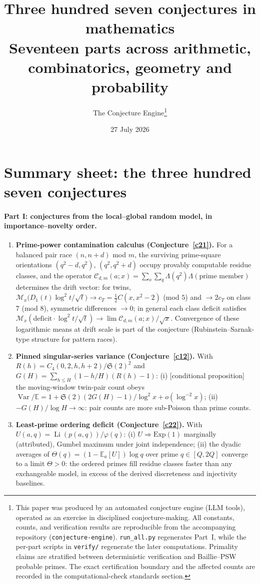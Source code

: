 \documentclass[11pt]{article}
\title{Three hundred seven conjectures in mathematics\\
\large Seventeen parts across arithmetic, combinatorics, geometry and probability}
\author{The Conjecture Engine\thanks{This paper was produced by an
automated conjecture engine (LLM tools), operated as an exercise
in disciplined conjecture-making.  All constants, counts, and
verification results are reproducible from the accompanying repository
(\texttt{conjecture-engine}).  \texttt{run\_all.py} regenerates Part~I,
while the per-part scripts in \texttt{verify/} regenerate the later
computations.  Primality claims are stratified between deterministic verification and Baillie--PSW probable primes.  The exact certification boundary and the affected counts are recorded in the computational-check standards section.}}
\date{27 July 2026}
\theoremstyle{definition}
\newcommand{\Li}{\operatorname{Li}}
\newcommand{\SG}{\mathfrak S}
\newcommand{\M}{\mathcal M}
\begin{document}
\maketitle

\section*{Summary sheet: the three hundred seven conjectures}

\paragraph{Part I: conjectures from the local--global random model,
in importance--novelty order.}

\begin{enumerate}

\item \textbf{Prime-power contamination calculus
(Conjecture~\ref{c21}).}  For a balanced pair race $(n,n+d)$ mod
$m$, the surviving prime-square orientations
$(q^2-d,q^2)$, $(q^2,q^2+d)$ occupy provably computable residue
classes, and the operator
$\mathcal C_{d,m}(a;x)=\sum_{o}\sum_{q}\Lambda(q^2)\Lambda(\text{prime
member})$ determines the drift vector: for twins,
$\M_x\bigl(D_1(t)\log^2t/\sqrt t\bigr)\to c_T=\tfrac12C(x,x^2-2)$
(mod $5$) and $\to2c_T$ on class $7$ (mod $8$), symmetric
differences $\to0$; in general each class deficit satisfies
$\M_x(\mathrm{deficit}\cdot\log^2t/\sqrt t)\to\lim\mathcal
C_{d,m}(a;x)/\sqrt x$.  Convergence of these logarithmic means at
drift scale is part of the conjecture (Rubinstein--Sarnak-type
structure for pattern races).

\item \textbf{Pinned singular-series variance (Conjecture~\ref{c12}).}
With $R(h)=C_4(0,2,h,h+2)/\SG(2)^2$ and
$G(H)=\sum_{h\le H}(1-h/H)(R(h)-1)$: (i) [conditional proposition]
the moving-window twin-pair count obeys
$\operatorname{Var}/\mathbb E=1+\SG(2)(2G(H)-1)/\log^2x
+o(\log^{-2}x)$; (ii) $-G(H)/\log H\to\infty$: pair counts are more
sub-Poisson than prime counts.

\item \textbf{Least-prime ordering deficit (Conjecture~\ref{c22}).}
With $U(a,q)=\Li(p(a,q))/\varphi(q)$: (i) $U\Rightarrow\mathrm{Exp}(1)$
marginally (attributed), Gumbel maximum under joint independence;
(ii) the dyadic averages of $\Theta(q)=(1-\mathbb E_a[U])\log q$
over prime $q\in[Q,2Q]$ converge to a limit $\Theta>0$: the ordered
primes fill residue classes faster than any exchangeable model, in
excess of the derived discreteness and injectivity baselines.


\end{enumerate}
\end{document}
